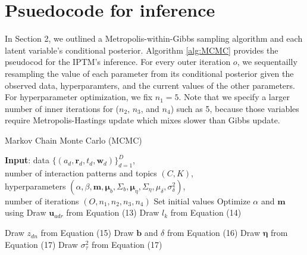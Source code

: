 \documentclass{article}
\begin{document}
\section{Psuedocode for inference} \label{sec: Pseudocode1}
In Section 2, we outlined a Metropolis-within-Gibbs sampling algorithm and each latent variable’s conditional posterior. Algorithm \ref{alg:MCMC} provides the pseudocod for the IPTM's inference. For every outer iteration $o$, we sequentailly resampling the value of each parameter from its conditional posterior given the observed data, hyperparamters, and the current values of the other parameters. For hyperparameter optimization, we fix $n_1=5$. Note that we specify a larger number of inner iterations for ($n_2$, $n_3$,
and $n_4$) such as 5, because those variables require Metropolis-Hastings update which mixes slower than Gibbs update.
\begin{algorithm}[H]
	\caption{Markov Chain Monte Carlo (MCMC)}
		\label{alg:MCMC}
		\begin{algorithmic}
		\STATE \textbf{Input}: data $ \{ (a_d, \boldsymbol{r}_d, t_d,  \boldsymbol{w}_d)\}_{d=1}^D$, \\
		number of interaction patterns and topics $(C, K)$,\\
		hyperparameters $(\alpha, \beta, \boldsymbol{m}, \boldsymbol{\mu}_b, \Sigma_b, \boldsymbol{\mu}_\eta, \Sigma_\eta, {\mu}_\delta,\sigma^2_\delta)$,\\
		number of iterations $(O, n_1, n_2, n_3, n_4)$
		\vskip 0.1in
		\STATE Set initial values
			\STATE Optimize $\alpha$ and $\boldsymbol{m}$ using \cite{wallach2008structured}
				\ENDFOR
				\STATE	Draw $\boldsymbol{u}_{adr}$ from Equation (13)
					\ENDFOR
						\ENDFOR
		\ENDFOR
			\STATE Draw $l_k$ from Equation (14)
			\ENDFOR
			
				\STATE Draw $z_{dn}$ from Equation (15)
					\ENDFOR
						\ENDFOR
			\STATE	Draw $\boldsymbol{b}$ and $\delta$ from Equation (16)
				\ENDFOR
		\STATE	Draw $\boldsymbol{\eta}$ from Equation (17)
			\ENDFOR
		\STATE	Draw $\sigma_\tau^2$ from Equation (17)
			\ENDFOR
 \ENDFOR
	\end{algorithmic}
\end{algorithm}
\end{document}
